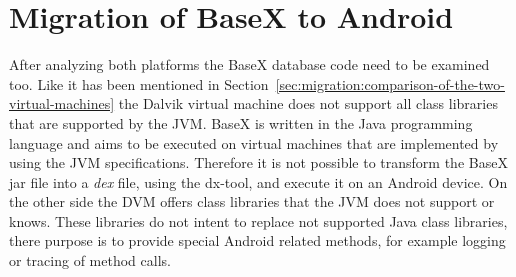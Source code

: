 \section{Migration of BaseX to Android}
\label{sec:migration:migration-of-basex-to-android}
After analyzing both platforms the BaseX database code need to be examined too.
Like it has been mentioned in Section~\ref{sec:migration:comparison-of-the-two-virtual-machines} the Dalvik virtual machine does not support all class libraries that are supported by the JVM.
BaseX is written in the Java programming language and aims to be executed on virtual machines that are implemented by using the JVM specifications.
Therefore it is not possible to transform the BaseX jar file into a \textit{dex} file, using the dx-tool, and execute it on an Android device.
On the other side the DVM offers class libraries that the JVM does not support or knows.
These libraries do not intent to replace not supported Java class libraries, there purpose is to provide special Android related methods, for example logging or tracing of method calls.

